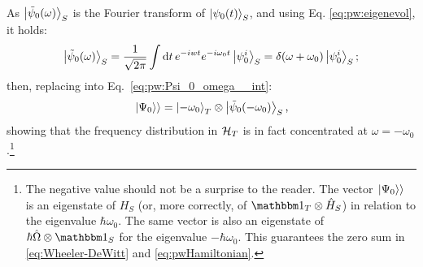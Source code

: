 As $\ket{\tilde{\psi}_{0}(\omega)}_{S}$ is the Fourier transform of $\ket{\psi_0(t)}_S$, and using Eq. \eqref{eq:pw:eigenevol}, it holds:
\[
  \ket{\tilde{\psi}_0(\omega)}_S = \frac{1}{\sqrt{2\pi}} \int \dd{t} e^{-iwt} e^{-i\omega_{0}t} \ket{\psi_0^i}_S
  = \delta(\omega+\omega_0)\ket{\psi_0^i}_S \text{;}
\]
then, replacing into Eq.~\eqref{eq:pw:Psi_0_omega__int}:
\begin{equation}\label{eq:pw:Psi_0_omega}
  \left.\left| \Psi_0 \right\rangle\right\rangle = \ket{-\omega_0}_{T}\otimes\ket{\tilde{\psi}_{0}(-\omega_0)}_{S} \text{,}
\end{equation}
%
showing that the frequency distribution in $\mathcal{H}_T$ is in fact concentrated at $\omega = -\omega_0$.\footnote{The
  negative value should not be a surprise to the reader.
  The vector $\left.\left| \Psi_0 \right\rangle\right\rangle$ is an eigenstate of $H_S$ (or, more correctly, of $\idop_T \ox \op{H}_S$)
  in relation to the eigenvalue $\hbar\omega_0$.
  The same vector is also
  an eigenstate of $\hbar\op{\Omega} \ox \idop_S$ for the eigenvalue $-\hbar\omega_0$.
  This guarantees the zero sum in \eqref{eq:Wheeler-DeWitt} and \eqref{eq:pwHamiltonian}.
}




